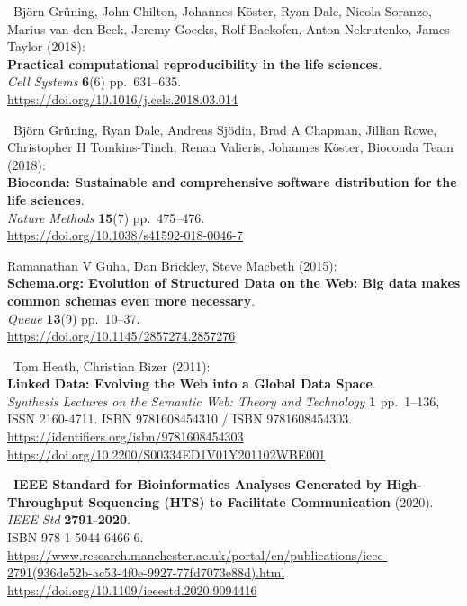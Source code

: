 \begin{thebibliography}{9}
~Björn Grüning, John Chilton, Johannes Köster, Ryan Dale, Nicola
Soranzo, Marius van den Beek, Jeremy Goecks, Rolf Backofen, Anton
Nekrutenko, James Taylor (2018):\\
\textbf{Practical computational reproducibility in the life sciences}.\\
\emph{Cell Systems} \textbf{6}(6) pp.~631--635.\\
\url{https://doi.org/10.1016/j.cels.2018.03.014}

~Björn Grüning, Ryan Dale, Andreas Sjödin, Brad A Chapman,
Jillian Rowe, Christopher H Tomkins-Tinch, Renan Valieris, Johannes
Köster, Bioconda Team (2018):\\
\textbf{Bioconda: Sustainable and comprehensive software distribution
for the life sciences}.\\
\emph{Nature Methods} \textbf{15}(7) pp.~475--476.\\
\url{https://doi.org/10.1038/s41592-018-0046-7}

 Ramanathan V Guha, Dan Brickley, Steve Macbeth (2015):\\
\textbf{Schema.org: Evolution of Structured Data on the Web: Big data
makes common schemas even more necessary}.\\
\emph{Queue} \textbf{13}(9) pp.~10--37.\\
\url{https://doi.org/10.1145/2857274.2857276}

~Tom Heath, Christian Bizer (2011):\\
\textbf{Linked Data: Evolving the Web into a Global Data Space}.\\
\emph{Synthesis Lectures on the Semantic Web: Theory and Technology}
\textbf{1} pp.~1--136, ISSN 2160-4711. ISBN 9781608454310 / ISBN
9781608454303. \url{https://identifiers.org/isbn/9781608454303}\\
\url{https://doi.org/10.2200/S00334ED1V01Y201102WBE001}

~\textbf{IEEE Standard for Bioinformatics Analyses Generated by
High-Throughput Sequencing (HTS) to Facilitate Communication} (2020).\\
\emph{IEEE Std} \textbf{2791-2020}.\\
ISBN 978-1-5044-6466-6.\\
\url{https://www.research.manchester.ac.uk/portal/en/publications/ieee-2791(936de52b-ac53-4f0e-9927-77fd7073e88d).html}~\\
\url{https://doi.org/10.1109/ieeestd.2020.9094416}


\end{thebibliography}
